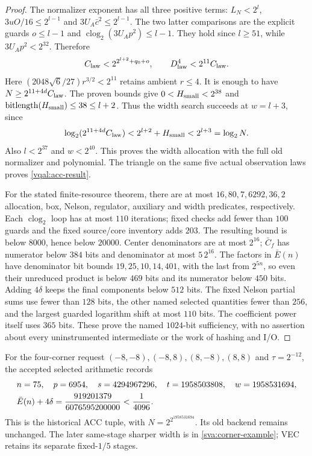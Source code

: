 \documentclass[11pt]{article}
\theoremstyle{plain}
\theoremstyle{definition}
\theoremstyle{remark}
\begin{document}
\begin{proof}
The normalizer exponent has all three positive terms:
$L_N<2^l$, $3uO/16\le2^{l-1}$ and
$3U_A\bar c^2\le2^{l-1}$. The two latter comparisons are the
explicit guards $o\le l-1$ and
$\operatorname{clog}_2(3U_Ap^2)\le l-1$.
They hold since $l\ge51$, while $3U_Ap^2<2^{32}$.
Therefore
\begin{equation}\label{vqal:acc-normalizer}
 C_{\rm law}<2^{2^{l+2}+q_0+o},\qquad
 D_{\rm law}^4<2^{11}C_{\rm law}.
\end{equation}
Here $(2048\sqrt6/27)r^{3/2}<2^{11}$ retains ambient $r\le4$.
It is enough to have $N\ge2^{11+4d}C_{\rm law}$.
The proven bounds give $0<H_{\rm small}<2^{38}$ and
$\operatorname{bitlength}(H_{\rm small})\le38\le l+2$.
Thus the width search succeeds at $w=l+3$, since
\begin{equation}\label{vqal:acc-symbolic}
 \log_2(2^{11+4d}C_{\rm law})
       <2^{l+2}+H_{\rm small}<2^{l+3}=\log_2N.
\end{equation}
Also $l<2^{37}$ and $w<2^{40}$. This proves the width allocation with
the full old normalizer and polynomial. The triangle on the same five
actual observation laws proves \eqref{vqal:acc-result}.

For the stated finite-resource theorem, there are at most $16,80,7,6292,36,2$
allocation, box, Nelson, regulator, auxiliary and width predicates,
respectively. Each $\operatorname{clog}_2$ loop has at most $110$
iterations; fixed checks add fewer than $100$ guards and the fixed
source/core inventory adds $203$. The resulting bound is below $8000$,
hence below $20000$. Center denominators are at most $2^{16}$;
$\bar C_f$ has numerator below $384$ bits and denominator at most
$5\,2^{16}$. The factors in $\bar E(n)$ have denominator bit bounds
$19,25,10,14,401$, with the last from $2^{5n}$, so even their unreduced
product is below $469$ bits and its numerator below $450$ bits.
Adding $4\delta$ keeps the final components below $512$ bits. The fixed
Nelson partial sums use fewer than $128$ bits, the other named selected
quantities fewer than $256$, and the largest guarded logarithm shift at
most $110$ bits. The coefficient power itself uses $365$ bits.
These prove the named $1024$-bit sufficiency, with no assertion about
every uninstrumented intermediate or the work of hashing and I/O.
\end{proof}

For the four-corner request $(-8,-8),(-8,8),(8,-8),(8,8)$ and
$\tau=2^{-12}$, the accepted selected arithmetic records
\begin{align}\label{vqal:acc-example}
 &n=75,\quad p=6954,\quad s=4294967296,\quad
 t=1958503808,\quad w=1958531694,\nonumber\\
 &\bar E(n)+4\delta={919201379\over6076595200000}<{1\over4096}.
\end{align}
This is the historical ACC tuple, with $N=2^{2^{1958531694}}$. Its old
backend remains unchanged. The later same-stage sharper width is in
\eqref{sva:corner-example}; VEC retains its separate fixed-$1/5$ stages.
\end{document}
